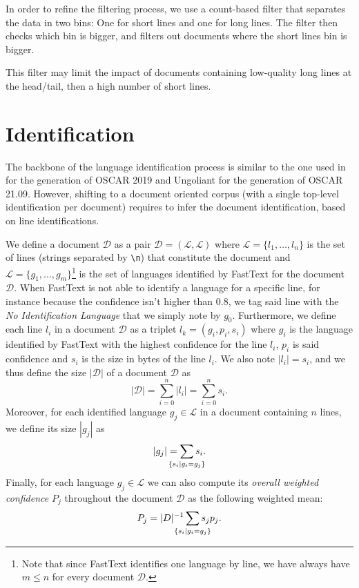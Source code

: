 In order to refine the filtering process, we use a count-based filter that separates the data in two bins: One for short lines and one for long lines. The filter then checks which bin is bigger, and filters out documents where the short lines bin is bigger.

This filter may limit the impact of documents containing low-quality long lines at the head/tail, then a high number of short lines.


\section{Identification}

The backbone of the language identification process is similar to the one used in \goclassy \cite{ortiz-suarez-etal-2019-asynchronous} for the generation of OSCAR 2019 and Ungoliant \cite{abadji-etal-2021-ungoliant} for the generation of OSCAR 21.09. However, shifting to a document oriented corpus (with a single top-level identification per document) requires to infer the document identification, based on line identifications.


We define a document $\mathcal{D}$ as a pair $\mathcal{D}=(\mathcal{L}, \mathscr{L})$ where $\mathcal{L}=\{l_1,\ldots,l_n\}$ is the set of lines (strings separated by \texttt{\textbackslash n}) that constitute the document and $\mathscr{L} = \{g_1, \ldots, g_m\}$\footnote{Note that since FastText identifies one language by line, we have always have $m\le n$ for every document $\mathcal{D}$.} is the set of languages identified by FastText for the document $\mathcal{D}$. When FastText is not able to identify a language for a specific line, for instance because the confidence isn't higher than $0.8$, we tag said line with the \emph{No Identification Language} that we simply note by $g_0$. Furthermore, we define each line $l_i$ in a document $\mathcal{D}$ as a triplet $l_k=(g_i, p_i, s_i)$ where $g_i$ is the language identified by FastText with the highest confidence for the line $l_i$, $p_i$ is said confidence and $s_i$ is the size in bytes of the line $l_i$. We also note $|l_i|=s_i$, and we thus define the size $|\mathcal{D}|$ of a document $\mathcal{D}$ as
\[
    |\mathcal{D}| = \sum_{i=0}^{n} |l_i| = \sum_{i=0}^{n} s_i.
\]
Moreover, for each identified language $g_j \in \mathscr{L}$ in a document containing $n$ lines, we define its size $|g_j|$ as
\[
    |g_j| = \sum_{\mathclap{\{s_i \mid g_i = g_j\}}} s_i.
\]
Finally, for each language $g_j \in \mathscr{L}$ we can also compute its \emph{overall weighted confidence} $P_j$ throughout the document $\mathcal{D}$ as the following weighted mean:
\[
    P_j = |D|^{-1}\sum_{\mathclap{\{s_i|g_i=g_j\}}} s_jp_j.
\]

